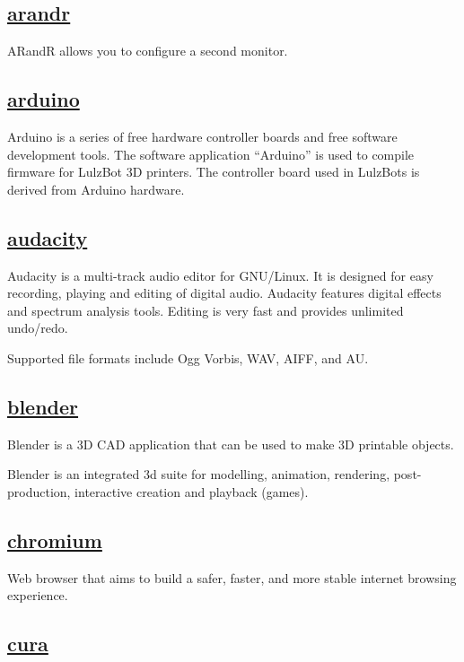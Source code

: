\subsection{\href{http://christian.amsuess.com/tools/arandr/}{arandr}}

ARandR allows you to configure a second monitor.

\subsection{\href{http://www.arduino.cc}{arduino}}

Arduino is a series of free hardware controller boards and free software
development tools. The software application ``Arduino'' is used to compile
firmware for LulzBot 3D printers. The controller board used in LulzBots is
derived from Arduino hardware.

\subsection{\href{http://audacity.sourceforge.net/}{audacity}}

 Audacity is a multi-track audio editor for GNU/Linux.
 It is designed for easy recording, playing and editing of
 digital audio.  Audacity features digital effects and spectrum
 analysis tools.  Editing is very fast and provides unlimited
 undo/redo.
 
 Supported file formats include Ogg Vorbis, WAV, AIFF, and AU.

\subsection{\href{http://www.blender.org/}{blender}}

Blender is a 3D CAD application that can be used to make 3D printable objects.

 Blender is an integrated 3d suite for modelling, animation, rendering,
 post-production, interactive creation and playback (games).

\subsection{\href{http://www.chromium.org/Home}{chromium}}

 Web browser that aims to build a safer, faster, and more stable internet
 browsing experience.
 
\subsection{\href{http://github.com/alephobjects/Cura}{cura}}

